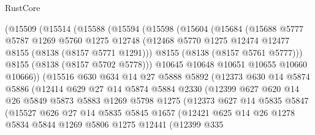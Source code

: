 \begin{lexlean}{RustCore}
\begin{coremodule}
          (@15509
            (@15514
              (@15588
                (@15594
                  (@15598
                    (@15604
                      (@15684
                        (@15688
                          @5777
                          @5787
                          @1269
                          @5760
                          @1275
                          @12748
                          (@12468 @5770 @1275 @12474 @12477 @8155 (@8138 (@8157 @5771 @1291)))
                          @8155
                          (@8138 (@8157 @5761 @5777)))
                        @8155
                        (@8138 (@8157 @5702 @5778)))
                      @10645
                      @10648
                      @10651
                      @10655
                      @10660
                      @10666))
                  (@15516
                    @630
                    @634
                    @14
                    @27
                    @5888
                    @5892
                    (@12373
                      @630
                      @14
                      @5874
                      @5886
                      (@12414
                        @629
                        @27
                        @14
                        @5874
                        @5884
                        @2330
                        (@12399
                          @627
                          @620
                          @14
                          @26
                          @5849
                          @5873
                          @5883
                          @1269
                          @5798
                          @1275
                          (@12373
                            @627
                            @14
                            @5835
                            @5847
                            (@15527
                              @626
                              @27
                              @14
                              @5835
                              @5845
                              @1657
                              (@12421
                                @625
                                @14
                                @26
                                @1278
                                @5834
                                @5844
                                @1269
                                @5806
                                @1275
                                @12441
                                (@12399
                                  @335

\end{coremodule}
\end{lexlean}
